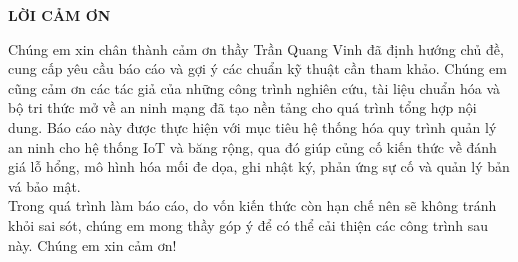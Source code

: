\documentclass[../DoAn.tex]{subfiles}
\begin{document}
\begin{center}
    \Large{\textbf{LỜI CẢM ƠN}}\\
\end{center}
\vspace{1cm}
Chúng em xin chân thành cảm ơn thầy Trần Quang Vinh đã định hướng chủ đề, cung cấp yêu cầu báo cáo và gợi ý các chuẩn kỹ thuật cần tham khảo. Chúng em cũng cảm ơn các tác giả của những công trình nghiên cứu, tài liệu chuẩn hóa và bộ tri thức mở về an ninh mạng đã tạo nền tảng cho quá trình tổng hợp nội dung. Báo cáo này được thực hiện với mục tiêu hệ thống hóa quy trình quản lý an ninh cho hệ thống IoT và băng rộng, qua đó giúp củng cố kiến thức về đánh giá lỗ hổng, mô hình hóa mối đe dọa, ghi nhật ký, phản ứng sự cố và quản lý bản vá bảo mật. \\ 
Trong quá trình làm báo cáo, do vốn kiến thức còn hạn chế nên sẽ không tránh khỏi sai sót, chúng em mong thầy góp ý để có thể cải thiện các công trình sau này. Chúng em xin cảm ơn!
\end{document}
